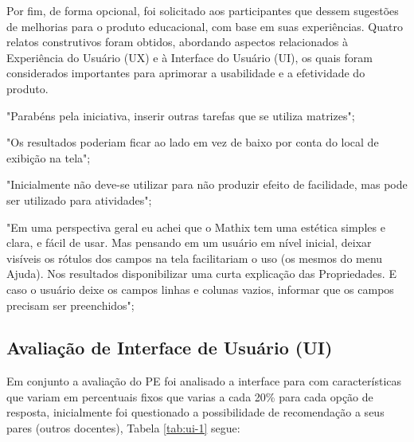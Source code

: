 
Por fim, de forma opcional, foi solicitado aos participantes que dessem sugestões de melhorias para o produto educacional, com base em suas experiências. Quatro relatos construtivos foram obtidos, abordando aspectos relacionados à Experiência do Usuário (UX) e à Interface do Usuário (UI), os quais foram considerados importantes para aprimorar a usabilidade e a efetividade do produto.


\begin{citacao}

    \item "Parabéns pela iniciativa, inserir outras tarefas que se utiliza matrizes";

    \item "Os resultados poderiam ficar ao lado em vez de baixo por conta do local de exibição na tela";

    \item "Inicialmente não deve-se utilizar para não produzir efeito de facilidade, mas pode ser utilizado para atividades";

    \item "Em uma perspectiva geral eu achei que o Mathix tem uma estética simples e clara, e fácil de usar. Mas pensando em um usuário em nível inicial, deixar visíveis os rótulos dos campos na tela facilitariam o uso (os mesmos do menu Ajuda). Nos resultados disponibilizar uma curta explicação das Propriedades. E caso o usuário deixe os campos linhas e colunas vazios, informar que os campos precisam ser preenchidos";

\end{citacao}







\subsection{Avaliação de Interface de Usuário (UI)}
\label{avaliacao_ui}

Em conjunto a avaliação do PE foi analisado a interface para com características que variam em percentuais fixos que varias a cada 20\% para cada opção de resposta, inicialmente foi questionado a possibilidade de recomendação a seus pares (outros docentes), Tabela \ref{tab:ui-1} segue: 

